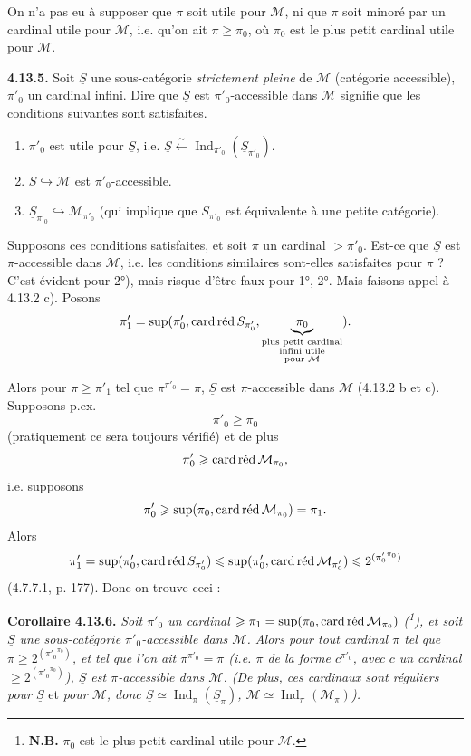\documentclass[11pt]{article}
\newcommand{\msp}[1]{\marginpar{\footnotesize [#1]}}
\newcommand{\M}{\mathcal{M}}
\newcommand{\Ind}{\operatorname{Ind}}
\newcommand{\card}{\operatorname{card}}
\newcommand{\red}{\mathop{\textup{réd}}\nolimits}
\newcommand{\uS}{\underline{S}}
\begin{document}
On n'a pas eu à supposer que $\pi$ soit utile pour $\M$, ni que $\pi$ soit minoré par un cardinal utile pour $\M$, i.e. qu'on ait $\pi \geqslant \pi_0$, où $\pi_0$ est le plus petit cardinal utile pour $\M$.

\msp{page 289}
\textbf{4.13.5.} Soit $\uS$ une sous-catégorie \textit{strictement pleine} de $\M$ (catégorie accessible), $\pi'_0$ un cardinal infini. Dire que $\uS$ est $\pi'_0$-accessible dans $\M$ signifie que les conditions suivantes sont satisfaites.
\begin{enumerate}
\item[1)] $\pi'_0$ est utile pour $\uS$, i.e. $\uS \xleftarrow{\sim} \Ind_{\pi'_0}(\uS_{\pi'_0})$.
\item[2)] $\uS \hookrightarrow \M$ est $\pi'_0$-accessible.
\item[3)] $\uS_{\pi'_0} \hookrightarrow \M_{\pi'_0}$ (qui implique que $S_{\pi'_0}$ est équivalente à une petite catégorie).
\end{enumerate}
Supposons ces conditions satisfaites, et soit $\pi$ un cardinal $> \pi'_0$. Est-ce que $\uS$ est $\pi$-accessible dans $\M$, i.e. les conditions similaires sont-elles satisfaites pour $\pi$ ? C'est évident pour 2°), mais risque d'être faux pour 1°, 2°. Mais faisons appel à 4.13.2 c). Posons
\[
\pi'_1 = \sup(\pi'_0, \card\red S_{\pi'_0}, \underbrace{\pi_0}_{\substack{\text{plus petit cardinal}\\ \text{infini utile}\\ \text{pour } \M}} ) .
\]

\msp{page 290}
Alors pour $\pi \geqslant \pi'_1$ tel que $\pi^{\pi'_0} = \pi$, $\uS$ est $\pi$-accessible dans $\M$ (4.13.2 b et c). Supposons p.ex.
\[
\pi'_0 \geqslant \pi_0
\]
(pratiquement ce sera toujours vérifié) et de plus
\[
\pi'_0 \geqslant \card\red\M_{\pi_0} ,
\]
i.e. supposons
\[
\pi'_0 \geqslant \sup(\pi_0, \card\red\M_{\pi_0}) = \pi_1 .
\]
Alors
\[
\pi'_1 = \sup(\pi'_0, \card\red S_{\pi'_0}) \leqslant \sup(\pi'_0, \card\red\M_{\pi'_0}) \leqslant 2^{({\pi'_0}^{\pi_0})}
\]
(4.7.7.1, p. 177). Donc on trouve ceci :

\textbf{Corollaire 4.13.6.} \textit{Soit $\pi'_0$ un cardinal $\geqslant \pi_1 = \sup(\pi_0, \card\red\M_{\pi_0})$ (\footnote[118]{\textbf{N.B.} $\pi_0$ est le plus petit cardinal utile pour $\M$.}), et soit $\uS$ une sous-catégorie $\pi'_0$-accessible dans $\M$. Alors pour tout cardinal $\pi$ tel que $\pi \geqslant 2^{({\pi'_0}^{\pi_0})}$, et tel que l'on ait $\pi^{\pi'_0} = \pi$ (i.e. $\pi$ de la forme $c^{\pi'_0}$, avec $c$ un cardinal $\geqslant 2^{({\pi'_0}^{\pi_0})}$), $\uS$ est $\pi$-accessible dans $\M$. (De plus, ces cardinaux sont réguliers pour $\uS$} et \textit{pour $\M$, donc $\uS \simeq \Ind_\pi(\uS_\pi)$, $\M \simeq \Ind_\pi(\M_\pi)$).}
\end{document}
